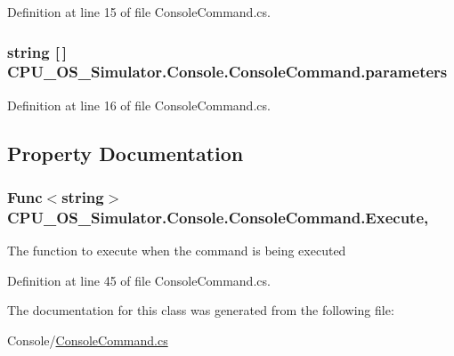Definition at line 15 of file Console\+Command.\+cs.

\hypertarget{class_c_p_u___o_s___simulator_1_1_console_1_1_console_command_a00586d96461c740fd20069c604424c22}{}
\subsubsection[{parameters}]{\setlength{\rightskip}{0pt plus 5cm}string \mbox{[}$\,$\mbox{]} C\+P\+U\+\_\+\+O\+S\+\_\+\+Simulator.\+Console.\+Console\+Command.\+parameters\hspace{0.3cm}{\ttfamily [private]}}\label{class_c_p_u___o_s___simulator_1_1_console_1_1_console_command_a00586d96461c740fd20069c604424c22}


Definition at line 16 of file Console\+Command.\+cs.



\subsection{Property Documentation}
\hypertarget{class_c_p_u___o_s___simulator_1_1_console_1_1_console_command_a9b4fd5675ec062a721c2e5e78022117b}{}
\subsubsection[{Execute}]{\setlength{\rightskip}{0pt plus 5cm}Func$<$string$>$ C\+P\+U\+\_\+\+O\+S\+\_\+\+Simulator.\+Console.\+Console\+Command.\+Execute\hspace{0.3cm}{\ttfamily [get]}, {\ttfamily [set]}}\label{class_c_p_u___o_s___simulator_1_1_console_1_1_console_command_a9b4fd5675ec062a721c2e5e78022117b}


The function to execute when the command is being executed 



Definition at line 45 of file Console\+Command.\+cs.



The documentation for this class was generated from the following file\+:\begin{DoxyCompactItemize}
\item 
Console/\hyperlink{_console_command_8cs}{Console\+Command.\+cs}\end{DoxyCompactItemize}
